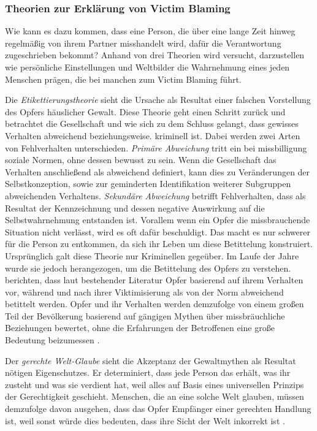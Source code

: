 \subsubsection{Theorien zur Erklärung von Victim Blaming}     \label{2.1.3.3}
Wie kann es dazu kommen, dass eine Person, die über eine lange Zeit hinweg regelmäßig von ihrem Partner misshandelt wird, dafür die Verantwortung zugeschrieben bekommt? Anhand von drei Theorien wird versucht, darzustellen wie persönliche Einstellungen und Weltbilder die Wahrnehmung eines jeden Menschen prägen, die bei manchen zum Victim Blaming führt.

Die \textit{Etikettierungstheorie} sieht die Ursache als Resultat einer falschen Vorstellung des Opfers häuslicher Gewalt. Diese Theorie geht einen Schritt zurück und betrachtet die Gesellschaft und wie sich zu dem Schluss gelangt, dass gewisses Verhalten abweichend beziehungsweise. kriminell ist. Dabei werden zwei Arten von Fehlverhalten unterschieden. \textit{Primäre Abweichung} tritt ein bei missbilligung soziale Normen, ohne dessen bewusst zu sein. Wenn die Gesellschaft das Verhalten anschließend als abweichend definiert, kann dies zu Veränderungen der Selbstkonzeption, sowie zur geminderten Identifikation weiterer Subgruppen abweichenden Verhaltens. \textit{Sekundäre Abweichung} betrifft Fehlverhalten, dass als Resultat der Kennzeichnung und dessen negative Auswirkung auf die Selbstwahrnehmung entstanden ist. Vorallem wenn ein Opfer die missbrauchende Situation nicht verlässt, wird es oft dafür beschuldigt. Das macht es nur schwerer für die Person zu entkommen, da sich ihr Leben um diese Betittelung konstruiert. Ursprünglich galt diese Theorie nur Kriminellen gegeüber. Im Laufe der Jahre wurde sie jedoch herangezogen, um die Betittelung des Opfers zu verstehen. \textcite{Labelingtheory_plus} berichten, dass laut bestehender Literatur Opfer basierend auf ihrem Verhalten vor, während und nach ihrer Viktimisierung als von der Norm abweichend betittelt werden. Opfer und ihr Verhalten werden demzufolge von einem großen Teil der Bevölkerung basierend auf gängigen Mythen über missbräuchliche Beziehungen bewertet, ohne die Erfahrungen der Betroffenen eine große Bedeutung beizumessen \parencite{Labelingtheory_plus}.

Der \textit{gerechte Welt-Glaube} sieht die Akzeptanz der Gewaltmythen als Resultat nötigen Eigenschutzes. Er determiniert, dass jede Person das erhält, was ihr zusteht und was sie verdient hat, weil alles auf Basis eines universellen Prinzips der Gerechtigkeit geschieht. Menschen, die an eine solche Welt glauben, müssen demzufolge davon ausgehen, dass das Opfer Empfänger einer gerechten Handlung ist, weil sonst würde dies bedeuten, dass ihre Sicht der Welt inkorrekt ist \parencite{GM_Theorien}. 


